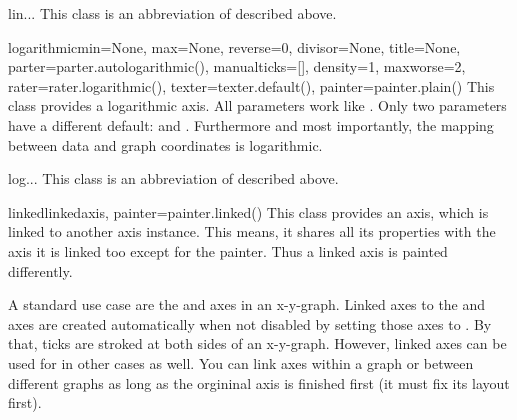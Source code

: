 \begin{classdesc}{lin}{...}
  This class is an abbreviation of  described above.
\end{classdesc}

\begin{classdesc}{logarithmic}{min=None, max=None, reverse=0, divisor=None, title=None,
                               parter=parter.autologarithmic(), manualticks=[],
                               density=1, maxworse=2, rater=rater.logarithmic(),
                               texter=texter.default(), painter=painter.plain()}
  This class provides a logarithmic axis. All parameters work like
  . Only two parameters have a different default:
   and . Furthermore and most importantly, the
  mapping between data and graph coordinates is logarithmic.
\end{classdesc}

\begin{classdesc}{log}{...}
This class is an abbreviation of  described above.
\end{classdesc}

\begin{classdesc}{linked}{linkedaxis, painter=painter.linked()}
  This class provides an axis, which is linked to another axis
  instance. This means, it shares all its properties with the axis it
  is linked too except for the painter. Thus a linked axis is painted
  differently.

  A standard use case are the  and  axes in an
  x-y-graph. Linked axes to the  and  axes are created
  automatically when not disabled by setting those axes to
  . By that, ticks are stroked at both sides of an
  x-y-graph. However, linked axes can be used for in other cases as
  well. You can link axes within a graph or between different graphs
  as long as the orgininal axis is finished first (it must fix its
  layout first).
\end{classdesc}

